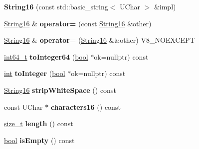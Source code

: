 \begin{DoxyCompactItemize}
{\bfseries String16} (const std\+::basic\+\_\+string$<$ U\+Char $>$ \&impl)
\item 
\mbox{\label{classv8__inspector_1_1String16_ad32361d82e2342cf738075252a048e9e}} 
\mbox{\hyperlink{classv8__inspector_1_1String16}{String16}} \& {\bfseries operator=} (const \mbox{\hyperlink{classv8__inspector_1_1String16}{String16}} \&other)
\item 
\mbox{\label{classv8__inspector_1_1String16_af87ad34a0dcb2f93fa0bf9998ad90f45}} 
\mbox{\hyperlink{classv8__inspector_1_1String16}{String16}} \& {\bfseries operator=} (\mbox{\hyperlink{classv8__inspector_1_1String16}{String16}} \&\&other) V8\+\_\+\+N\+O\+E\+X\+C\+E\+PT
\item 
\mbox{\label{classv8__inspector_1_1String16_a833e28f5bf79b5a4ab16e80bfd53cd1f}} 
\mbox{\hyperlink{classint64__t}{int64\+\_\+t}} {\bfseries to\+Integer64} (\mbox{\hyperlink{classbool}{bool}} $\ast$ok=nullptr) const
\item 
\mbox{\label{classv8__inspector_1_1String16_a42f9e02c4e94865e7ca5b2e5d90d5140}} 
\mbox{\hyperlink{classint}{int}} {\bfseries to\+Integer} (\mbox{\hyperlink{classbool}{bool}} $\ast$ok=nullptr) const
\item 
\mbox{\label{classv8__inspector_1_1String16_a3b4e8722708f4762ad0debab9d96a5b6}} 
\mbox{\hyperlink{classv8__inspector_1_1String16}{String16}} {\bfseries strip\+White\+Space} () const
\item 
\mbox{\label{classv8__inspector_1_1String16_a52b73fad670d3aff9e619ac6fc985917}} 
const U\+Char $\ast$ {\bfseries characters16} () const
\item 
\mbox{\label{classv8__inspector_1_1String16_a2f375bd33fcfba82b7c8beeccd98a683}} 
\mbox{\hyperlink{classsize__t}{size\+\_\+t}} {\bfseries length} () const
\item 
\mbox{\label{classv8__inspector_1_1String16_a657d71247a270c0ad98b244e5d245259}} 
\mbox{\hyperlink{classbool}{bool}} {\bfseries is\+Empty} () const

\end{DoxyCompactItemize}

